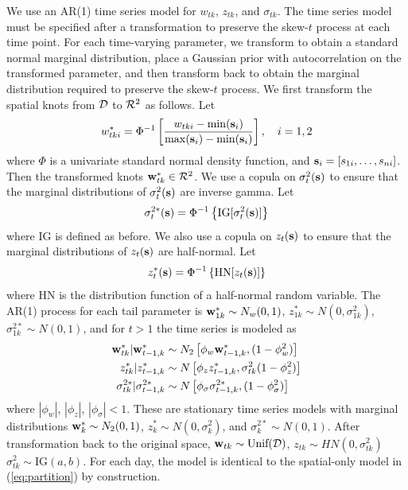 \documentclass[11pt]{article}
\begin{document}
We use an AR(1) time series model for $w_{tk}$, $z_{tk}$, and $\sigma_{tk}$.
The time series model must be specified after a transformation to preserve the skew-$t$ process at each time point.
For each time-varying parameter, we transform to obtain a standard normal marginal distribution, place a Gaussian prior with autocorrelation on the transformed parameter, and then transform back to obtain the marginal distribution required to preserve the skew-$t$ process.
We first transform the spatial knots from ${\cal D}$ to ${\cal R}^2$ as follows.
Let
\begin{align}
  w^*_{tki} = \Phi^{-1}\left[ \frac{ w_{tki} - \min(\mbox{\bf s}_i)}{ \max(\mbox{\bf s}_i) - \min(\mbox{\bf s}_i) } \right], \quad i = 1, 2
\end{align}
where $\Phi$ is a univariate standard normal density function, and $\mbox{\bf s}_i = [s_{1i}, \ldots, s_{ni}]$.
Then the transformed knots $\mbox{\bf w}^*_{tk} \in {\cal R}^2$.
We use a copula on $\sigma^2_t(\mbox{\bf s})$ to ensure that the marginal distributions of $\sigma^2_t(\mbox{\bf s})$ are inverse gamma.
Let
\begin{align}
  \sigma^{2*}_t(\mbox{\bf s}) =\Phi^{-1}\left\{ \text{IG}[\sigma^2_t(\mbox{\bf s})] \right\}
\end{align}
where IG is defined as before.
We also use a copula on $z_{t}(\mbox{\bf s})$ to ensure that the marginal distributions of $z_t(\mbox{\bf s})$ are half-normal.
Let
\begin{align}
  z^*_t(\mbox{\bf s}) = \Phi^{-1}\left\{ \text{HN}[z_t(\mbox{\bf s})] \right\}
\end{align}
where HN is the distribution function of a half-normal random variable.
The AR(1) process for each tail parameter is $\mbox{\bf w}^*_{1k} \sim N_w(0, 1)$, $z^*_{1k} \sim N(0, \sigma^2_{1k})$, $\sigma^{2*}_{1k} \sim N(0, 1)$, and for $t > 1$ the time series is modeled as
\begin{align}
  \mbox{\bf w}^*_{tk} | \mbox{\bf w}^*_{t-1, k} &\sim N_2\left[\phi_w \mbox{\bf w}^*_{t-1, k}, (1 - \phi_w^2) \right] \\
  z^*_{tk} | z^*_{t-1, k} &\sim N \left[\phi_z z^*_{t-1, k}, \sigma^2_{tk} (1 - \phi_z^2)\right] \\
  \sigma^{2*}_{tk} | \sigma^{2*}_{t-1, k} &\sim N \left[\phi_\sigma \sigma^{2*}_{t-1, k}, (1 - \phi_\sigma^2) \right]
\end{align}
where $|\phi_w|$, $|\phi_z|$, $|\phi_\sigma| < 1$.
These are stationary time series models with marginal distributions \hbox{$\mbox{\bf w}^*_{k} \sim N_2(0, 1)$}, \hbox{$z^*_{k} \sim N(0, \sigma^2_{k})$}, and \hbox{$\sigma^{2*}_{k} \sim N(0, 1)$}.
After transformation back to the original space, $\mbox{\bf w}_{tk} \sim \text{Unif}({\cal D})$, $z_{tk} \sim HN(0, \sigma^2_{tk})$ $\sigma^2_{tk} \sim \text{IG}(a, b)$.
For each day, the model is identical to the spatial-only model in (\ref{eq:partition}) by construction.
\end{document}
